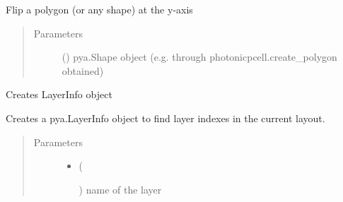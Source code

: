 \documentclass[a4paper,10pt,english]{sphinxmanual}
\begin{document}
\begin{fulllineitems}
\begin{fulllineitems}
\begin{quote}
\begin{description}
\end{description}\end{quote}

\end{fulllineitems}


\begin{fulllineitems}
\label{\detokenize{photonics/photonics:kppc.photonics.PhotDevice.flip_shape_yaxis}}
Flip a polygon (or any shape) at the y-axis
\begin{quote}\begin{description}
\item[{Parameters}] \leavevmode
{} () \textendash{} pya.Shape object (e.g. through photonicpcell.create\_polygon obtained)

\end{description}\end{quote}

\end{fulllineitems}


\begin{fulllineitems}
\label{\detokenize{photonics/photonics:kppc.photonics.PhotDevice.get_layer}}
Creates LayerInfo object

Creates a pya.LayerInfo object to find layer indexes in the current layout.
\begin{quote}\begin{description}
\item[{Parameters}] \leavevmode\begin{itemize}
\item {} 
 (%
\begin{footnote}[68]\sphinxAtStartFootnote
{}
%
\end{footnote}) \textendash{} name of the layer


\end{itemize}
\end{description}
\end{quote}
\end{fulllineitems}
\end{fulllineitems}
\end{document}

